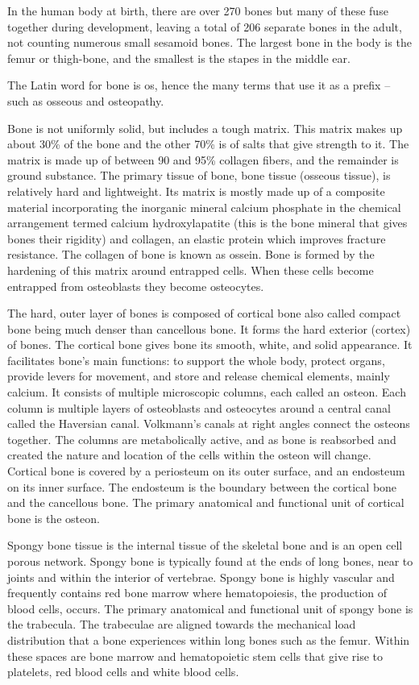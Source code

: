 In the human body at birth, there are over 270 bones but many of these
fuse together during development, leaving a total of 206 separate bones
in the adult, not counting numerous small sesamoid bones. The largest
bone in the body is the femur or thigh-bone, and the smallest is the
stapes in the middle ear.

The Latin word for bone is os, hence the many terms that use it as a
prefix -- such as osseous and osteopathy.

Bone is not uniformly solid, but includes a tough matrix. This matrix
makes up about 30\% of the bone and the other 70\% is of salts that give
strength to it. The matrix is made up of between 90 and 95\% collagen
fibers, and the remainder is ground substance. The primary tissue of
bone, bone tissue (osseous tissue), is relatively hard and lightweight.
Its matrix is mostly made up of a composite material incorporating the
inorganic mineral calcium phosphate in the chemical arrangement termed
calcium hydroxylapatite (this is the bone mineral that gives bones their
rigidity) and collagen, an elastic protein which improves fracture
resistance. The collagen of bone is known as ossein. Bone is formed by
the hardening of this matrix around entrapped cells. When these cells
become entrapped from osteoblasts they become osteocytes.

The hard, outer layer of bones is composed of cortical bone also called
compact bone being much denser than cancellous bone. It forms the hard
exterior (cortex) of bones. The cortical bone gives bone its smooth,
white, and solid appearance. It facilitates bone's main functions: to
support the whole body, protect organs, provide levers for movement, and
store and release chemical elements, mainly calcium. It consists of
multiple microscopic columns, each called an osteon. Each column is
multiple layers of osteoblasts and osteocytes around a central canal
called the Haversian canal. Volkmann's canals at right angles connect
the osteons together. The columns are metabolically active, and as bone
is reabsorbed and created the nature and location of the cells within
the osteon will change. Cortical bone is covered by a periosteum on its
outer surface, and an endosteum on its inner surface. The endosteum is
the boundary between the cortical bone and the cancellous bone. The
primary anatomical and functional unit of cortical bone is the osteon.

Spongy bone tissue is the internal tissue of the skeletal bone and is an
open cell porous network. Spongy bone is typically found at the ends of
long bones, near to joints and within the interior of vertebrae. Spongy
bone is highly vascular and frequently contains red bone marrow where
hematopoiesis, the production of blood cells, occurs. The primary
anatomical and functional unit of spongy bone is the trabecula. The
trabeculae are aligned towards the mechanical load distribution that a
bone experiences within long bones such as the femur. Within these
spaces are bone marrow and hematopoietic stem cells that give rise to
platelets, red blood cells and white blood cells.


